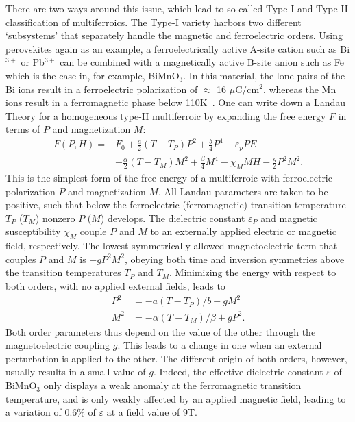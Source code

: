 There are two ways around this issue, which lead to so-called Type-I and Type-II classification of multiferroics\cite{Khomskii2009}.
The Type-I variety harbors two different `subsystems' that separately handle the magnetic and ferroelectric orders.
Using perovskites again as an example, a ferroelectrically active A-site cation such as Bi$^{3+}$ or Pb$^{3+}$ can be combined with a magnetically active B-site anion such as Fe which is the case in, for example, BiMnO$_3$. In this material, the lone pairs of the Bi ions result in a ferroelectric polarization of $\approx$ 16 $\mu$C/cm$^2$, whereas the Mn ions result in a ferromagnetic phase below 110K~\cite{Wang2009}.
One can write down a Landau Theory for a homogeneous type-II multiferroic by expanding the free energy $F$ in terms of $P$ and magnetization $M$:
\begin{align}
	F(P, H) =& F_0 + \frac{a}{2} (T-T_P) P^2 + \frac{b}{4} P^4 - \varepsilon_p P E \\
	&+\frac{\alpha}{2} (T-T_M)M^2 + \frac{\beta}{4} M^4 - \chi_M MH - \frac{g}{2}P^2 M^2.
\end{align}
This is the simplest form of the free energy of a multiferroic with ferroelectric polarization $P$ and magnetization $M$. All Landau parameters are taken to be positive, such that below the ferroelectric (ferromagnetic) transition temperature $T_P$ ($T_M$) nonzero $P$ ($M$) develops. The dielectric constant $\varepsilon_P$ and magnetic susceptibility $\chi_M$ couple $P$ and $M$ to an externally applied electric or magnetic field, respectively. The lowest symmetrically allowed magnetoelectric term that couples $P$ and $M$ is $-gP^2M^2$, obeying both time and inversion symmetries above the transition temperatures $T_P$ and $T_M$.
Minimizing the energy with respect to both orders, with no applied external fields, leads to
\begin{align}
	P^2 &= - a(T-T_P)/b + gM^2\\
	M^2 &= - \alpha(T-T_M)/\beta + gP^2.
\end{align}
Both order parameters thus depend on the value of the other through the magnetoelectric coupling $g$. This leads to a change in one when an external perturbation is applied to the other.
The different origin of both orders, however, usually results in a small value of $g$. Indeed, the effective dielectric constant $\varepsilon$ of BiMnO$_3$ only displays a weak anomaly at the ferromagnetic transition temperature, and is only weakly affected by an applied magnetic field, leading to a variation of 0.6\% of $\varepsilon$ at a field value of 9T.

